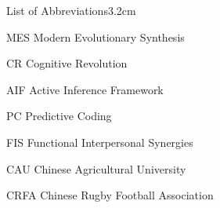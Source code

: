 \begin{mclistof}{List of Abbreviations}{3.2cm}

  \item[MES] Modern Evolutionary Synthesis
  \item[CR] Cognitive Revolution
  \item[AIF] Active Inference Framework
  \item[PC] Predictive Coding
  \item[FIS] Functional Interpersonal Synergies
  \item[CAU] Chinese Agricultural University
  \item[CRFA] Chinese Rugby Football Association

\end{mclistof}
